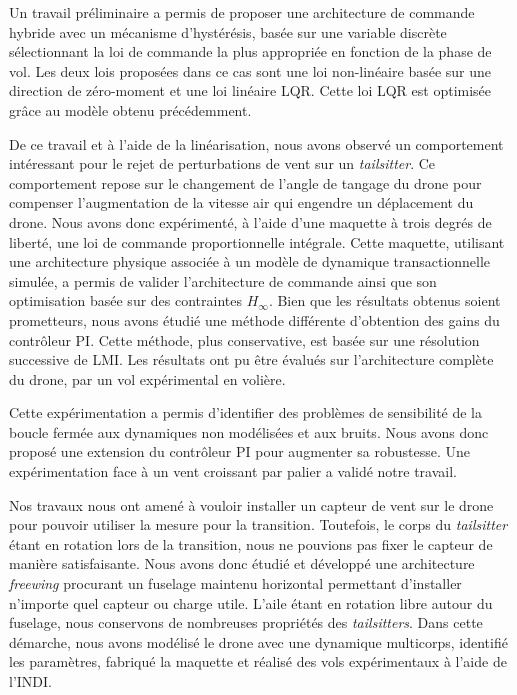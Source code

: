 Un travail préliminaire a permis de proposer une architecture de commande hybride avec un mécanisme d'hystérésis, basée sur une variable discrète sélectionnant la loi de commande la plus appropriée en fonction de la phase de vol. Les deux lois proposées dans ce cas sont une loi non-linéaire basée sur une direction de zéro-moment et une loi linéaire LQR. Cette loi LQR est optimisée grâce au modèle obtenu précédemment.

De ce travail et à l'aide de la linéarisation, nous avons observé un comportement intéressant pour le rejet de perturbations de vent sur un \textit{tailsitter}. Ce comportement repose sur le changement de l'angle de tangage du drone pour compenser l'augmentation de la vitesse air qui engendre un déplacement du drone. Nous avons donc expérimenté, à l'aide d'une maquette à trois degrés de liberté, une loi de commande proportionnelle intégrale. Cette maquette, utilisant une architecture physique associée à un modèle de dynamique transactionnelle simulée, a permis de valider l'architecture de commande ainsi que son optimisation basée sur des contraintes $H_{\infty}$.
Bien que les résultats obtenus soient prometteurs, nous avons étudié une méthode différente d'obtention des gains du contrôleur PI. Cette méthode, plus conservative, est basée sur une résolution successive de LMI. Les résultats ont pu être évalués sur l'architecture complète du drone, par un vol expérimental en volière.

Cette expérimentation a permis d'identifier des problèmes de sensibilité de la boucle fermée aux dynamiques non modélisées et aux bruits. Nous avons donc proposé une extension du contrôleur PI pour augmenter sa robustesse. Une expérimentation face à un vent croissant par palier a validé notre travail.

Nos travaux nous ont amené à vouloir installer un capteur de vent sur le drone pour pouvoir utiliser la mesure pour la transition. Toutefois, le corps du \textit{tailsitter} étant en rotation lors de la transition, nous ne pouvions pas fixer le capteur de manière satisfaisante. Nous avons donc étudié et développé une architecture \textit{freewing} procurant un fuselage maintenu horizontal permettant d'installer n'importe quel capteur ou charge utile. L'aile étant en rotation libre autour du fuselage, nous conservons de nombreuses propriétés des \textit{tailsitters}. Dans cette démarche, nous avons modélisé le drone avec une dynamique multicorps, identifié les paramètres, fabriqué la maquette et réalisé des vols expérimentaux à l'aide de l'INDI.

